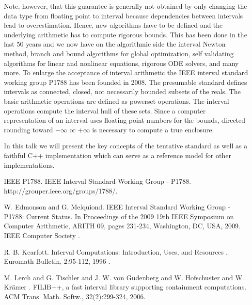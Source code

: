 \documentclass[article, A4, 11pt]{llncs}%
\begin{document}
Note, however, that this guarantee is generally not obtained by only changing the data type from floating point to interval because dependencies between intervals lead to overestimation. Hence, new algorithms have to be defined and the underlying arithmetic has to compute rigorous bounds. This has been done in the last 50 years and we now have on the algorithmic side the interval Newton method, branch and bound algorithms for global optimization, self validating algorithms for linear and nonlinear equations, rigorous ODE solvers, and many more. To enlarge the acceptance of interval arithmetic the IEEE interval standard working group P1788 has been founded in 2008. The presumable standard  defines intervals as connected, closed, not necessarily  bounded subsets of the reals.  The basic arithmetic operations are defined as powerset  operations.  The interval operations compute the interval hull of these sets. Since a computer representation of an interval uses floating point numbers for the bounds, directed rounding toward $-\infty$ or $+\infty$ is necessary to compute a true enclosure. 

In this talk we will present the key concepts of the tentative standard as 
well as a faithful C++ implementation  which can serve as a reference model for 
other implementations. 


\begin{thebibliography}{10}
{\sc IEEE P1788}. {IEEE Interval Standard Working Group - P1788}. http://grouper.ieee.org/groups/1788/.

{\sc W. Edmonson and G. Melquiond}. {IEEE Interval Standard Working Group - P1788: Current Status}. In Proceedings of the 2009 19th IEEE Symposium on Computer Arithmetic, ARITH 09, pages 231-234, Washington, DC, USA, 2009. IEEE Computer Society .

{\sc R. B. Kearfott}. {Interval Computations: Introduction, Uses, and Resources }. Euromath Bulletin, 2:95-112, 1996 .

{\sc M. Lerch and G. Tischler and J. W. von Gudenberg and W. Hofschuster and W. Kr\"amer }. {FILIB++, a fast interval library supporting containment computations}. ACM Trans. Math. Softw., 32(2):299-324, 2006.
\end{thebibliography} %
\end{document}
